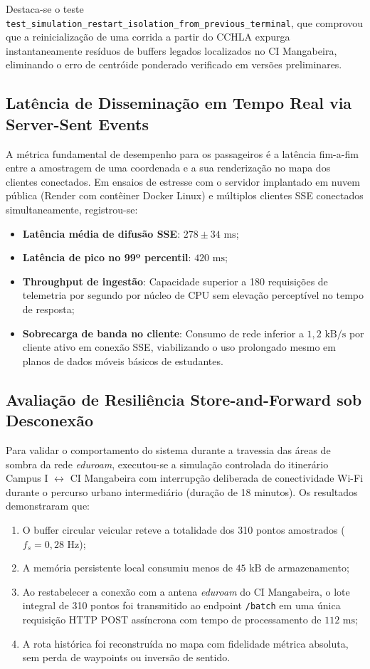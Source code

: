 \documentclass[lettersize,journal]{IEEEtran}
\begin{document}
Destaca-se o teste \texttt{test\_simulation\_restart\_isolation\_from\_previous\_terminal}, que comprovou que a reinicialização de uma corrida a partir do CCHLA expurga instantaneamente resíduos de buffers legados localizados no CI Mangabeira, eliminando o erro de centróide ponderado verificado em versões preliminares.

\subsection{Latência de Disseminação em Tempo Real via Server-Sent Events}
A métrica fundamental de desempenho para os passageiros é a latência fim-a-fim entre a amostragem de uma coordenada e a sua renderização no mapa dos clientes conectados.
Em ensaios de estresse com o servidor implantado em nuvem pública (Render com contêiner Docker Linux) e múltiplos clientes SSE conectados simultaneamente, registrou-se:
\begin{itemize}
    \item \textbf{Latência média de difusão SSE}: $278 \pm 34\text{~ms}$;
    \item \textbf{Latência de pico no 99º percentil}: $420\text{~ms}$;
    \item \textbf{Throughput de ingestão}: Capacidade superior a 180 requisições de telemetria por segundo por núcleo de CPU sem elevação perceptível no tempo de resposta;
    \item \textbf{Sobrecarga de banda no cliente}: Consumo de rede inferior a $1,2\text{~kB/s}$ por cliente ativo em conexão SSE, viabilizando o uso prolongado mesmo em planos de dados móveis básicos de estudantes.
\end{itemize}

\subsection{Avaliação de Resiliência Store-and-Forward sob Desconexão}
Para validar o comportamento do sistema durante a travessia das áreas de sombra da rede \textit{eduroam}, executou-se a simulação controlada do itinerário Campus I $\leftrightarrow$ CI Mangabeira com interrupção deliberada de conectividade Wi-Fi durante o percurso urbano intermediário (duração de 18 minutos).
Os resultados demonstraram que:
\begin{enumerate}
    \item O buffer circular veicular reteve a totalidade dos 310 pontos amostrados ($f_s = 0,28\text{~Hz}$);
    \item A memória persistente local consumiu menos de $45\text{~kB}$ de armazenamento;
    \item Ao restabelecer a conexão com a antena \textit{eduroam} do CI Mangabeira, o lote integral de 310 pontos foi transmitido ao endpoint \texttt{/batch} em uma única requisição HTTP POST assíncrona com tempo de processamento de $112\text{~ms}$;
    \item A rota histórica foi reconstruída no mapa com fidelidade métrica absoluta, sem perda de waypoints ou inversão de sentido.
\end{enumerate}
\end{document}
